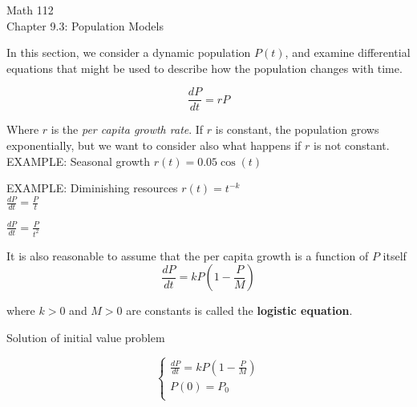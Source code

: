 \documentclass[11pt]{article}
\begin{document}
\begin{center}
\Large
\rm{Math 112}
\\
\rm{Chapter 9.3:  Population Models}\\

\end{center}
\vspace{0.2in}

\vspace{0.2in}

In this section, we consider a dynamic population $P(t)$, and examine differential equations
that might be used to describe how the population changes with time.

\begin{displaymath}
\frac{dP}{dt} = rP 
\end{displaymath}

Where $r$ is the \emph{per capita growth rate}.   If $r$ is constant, the population grows exponentially,
but we want to consider also what happens if $r$ is not constant.\\

EXAMPLE:  Seasonal growth $r(t) = 0.05\cos(t)$\\

\vspace{2.5in}



EXAMPLE:  Diminishing resources $r(t) = t^{-k}$\\

$\frac{dP}{dt} = \frac{P}{t} $

\pagebreak

$\frac{dP}{dt} = \frac{P}{t^2}$

\vspace{2.5in}

It is also reasonable to assume that the per capita growth is a function of $P$ itself
\begin{displaymath}
\frac{dP}{dt} = kP\left(1-\frac{P}{M} \right) 
\end{displaymath}

where $k>0$ and $M>0$ are constants is called the {\bf logistic equation}.

\vspace{0.1in}
	

\pagebreak

Solution of initial value problem	
	
\begin{displaymath}
  \left\{ \begin{array}{ll}
  
  \frac{dP}{dt} = kP\left(1-\frac{P}{M} \right) \\
P(0) = P_0 \\
\end{array} \right.
\end{displaymath}
	
\end{document}
